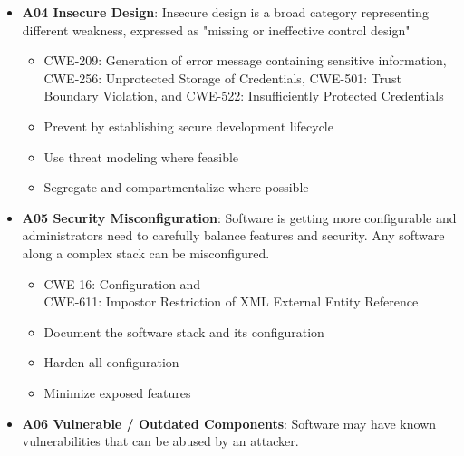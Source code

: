 \documentclass[11pt]{article}
\begin{document}
\begin{itemize}
		\begin{itemize}
			\item CWE-79: Cross-site Scripting, \\
			  CWE-89: SQL Injection, and \\ 
			  CWE-73: External Control of File Name or Path
			\item Reduce attack surface by shifting to safe API
			\item Sanitize user input through validation and escaping
			\item Validate input whenever possible
			\item Escape remaining characters when necessary
		\end{itemize}
	\item \textbf{A04 Insecure Design}: Insecure design is a broad category representing different weakness, expressed as "missing or ineffective control design"
		\begin{itemize}
			\item CWE-209: Generation of error message containing sensitive information, \\
			  CWE-256: Unprotected Storage of Credentials, 
			  CWE-501: Trust Boundary Violation, and
			  CWE-522: Insufficiently Protected Credentials
			\item Prevent by establishing secure development lifecycle
			\item Use threat modeling where feasible
			\item Segregate and compartmentalize where possible
		\end{itemize}
	\item \textbf{A05 Security Misconfiguration}: Software is getting more configurable and administrators need to carefully balance features and security. Any software along a complex stack can be misconfigured.
		\begin{itemize}
			\item CWE-16: Configuration and \\
			  CWE-611: Impostor Restriction of XML External Entity Reference
			\item Document the software stack and its configuration
			\item Harden all configuration
			\item Minimize exposed features
		\end{itemize}
	\item \textbf{A06 Vulnerable / Outdated Components}: Software may have known vulnerabilities that can be abused by an attacker. 

\end{itemize}
\end{document}
